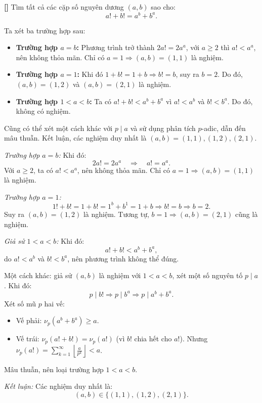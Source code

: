 \documentclass[../04-diophantine-equations.tex]{subfiles}
\begin{document}
\begin{example*}\label{example:MEMO-2015-T-P7}\textbf{[]}
	Tìm tất cả các cặp số nguyên dương \( (a, b) \) sao cho:
	\[
		a! + b! = a^b + b^a.
	\]	
\end{example*}

\begin{story*}
    Ta xét ba trường hợp sau:
    \begin{itemize}[topsep=0pt, partopsep=0pt, itemsep=0pt]
        \item \textbf{Trường hợp \(a = b\):} Phương trình trở thành \( 2a! = 2a^a \), với \( a \ge 2 \) thì \( a! < a^a \), nên không thỏa mãn. Chỉ có \( a = 1 \Rightarrow (a, b) = (1, 1) \) là nghiệm.
        \item \textbf{Trường hợp \(a = 1\):} Khi đó \( 1 + b! = 1 + b \Rightarrow b! = b \), suy ra \( b = 2 \). Do đó, \( (a, b) = (1, 2) \) và \( (a, b) = (2, 1) \) là nghiệm.
        \item \textbf{Trường hợp \(1 < a < b\):} Ta có \( a! + b! < a^b + b^a \) vì \( a! < a^b \) và \( b! < b^a \). Do đó, không có nghiệm.
    \end{itemize}
    Cũng có thể xét một cách khác với \( p \mid a \) và sử dụng phân tích \( p \)-adic, dẫn đến mâu thuẫn.  
    Kết luận, các nghiệm duy nhất là \( (a, b) = (1, 1), (1, 2), (2, 1) \).
\end{story*}

\bigbreak

\begin{soln}\footnotemark
	\textit{Trường hợp \(a = b\):} Khi đó:
	\[
		2a! = 2a^a \quad \Rightarrow \quad a! = a^a.
	\]
	Với \( a \ge 2 \), ta có \( a! < a^a \), nên không thỏa mãn.  
	Chỉ có \( a = 1 \Rightarrow (a, b) = (1, 1) \) là nghiệm.

	\textit{Trường hợp \(a = 1\):}
	\[
		1! + b! = 1 + b! = 1^b + b^1 = 1 + b \Rightarrow b! = b \Rightarrow b = 2.
	\]
	Suy ra \( (a, b) = (1, 2) \) là nghiệm. Tương tự, \( b = 1 \Rightarrow (a, b) = (2, 1) \) cũng là nghiệm.

	\textit{Giả sử \(1 < a < b\):} Khi đó:
	\[
		a! + b! < a^b + b^a,
	\]
	do \( a! < a^b \) và \( b! < b^a \), nên phương trình không thể đúng.

	Một cách khác: giả sử \( (a, b) \) là nghiệm với \( 1 < a < b \), xét một số nguyên tố \( p \mid a \). Khi đó:
	\[
		p \mid b! \Rightarrow p \mid b^a \Rightarrow p \mid a^b + b^a.
	\]
	Xét số mũ \( p \) hai vế:
	\begin{itemize}[topsep=0pt, partopsep=0pt, itemsep=0pt]
	    \item Vế phải: \( \nu_p(a^b + b^a) \ge a \).
	    \item Vế trái: \( \nu_p(a! + b!) = \nu_p(a!) \) (vì \( b! \) chia hết cho \( a! \)).  
	    Nhưng \( \nu_p(a!) = \sum_{k=1}^\infty \left\lfloor \frac{a}{p^k} \right\rfloor < a \).
	\end{itemize}
	Mâu thuẫn, nên loại trường hợp \( 1 < a < b \).

	\textit{Kết luận:} Các nghiệm duy nhất là:
	\[
		\boxed{(a, b) \in \{(1, 1), (1, 2), (2, 1)\}}.
	\]
\end{soln}

\end{document}
